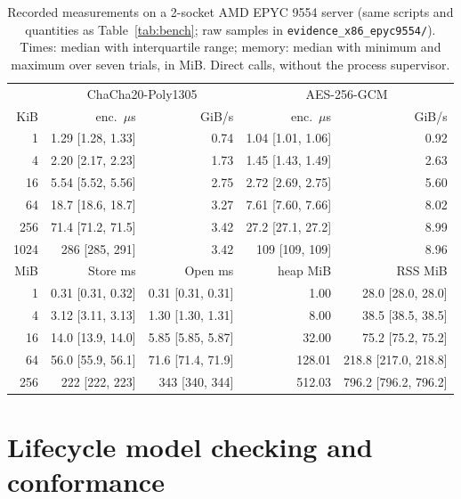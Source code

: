 \documentclass[pdflatex,sn-mathphys-num]{sn-jnl}
\newcommand{\fpath}[1]{\nolinkurl{#1}}%
\theoremstyle{plain}
\begin{document}
\begin{table}[htbp]
\caption{Recorded measurements on a 2-socket AMD EPYC 9554 server (same scripts and quantities as Table~\ref{tab:bench}; raw samples in \fpath{evidence_x86_epyc9554/}). Times: median with interquartile range; memory: median with minimum and maximum over seven trials, in MiB. Direct calls, without the process supervisor.}\label{tab:bench-x86}
\centering\footnotesize
\begin{tabular}{@{}rrrrr@{}}\toprule
& \multicolumn{2}{c}{ChaCha20-Poly1305} & \multicolumn{2}{c}{AES-256-GCM}\\
KiB & enc.\ $\mu$s & GiB/s & enc.\ $\mu$s & GiB/s\\\midrule
1 & 1.29 [1.28, 1.33] & 0.74 & 1.04 [1.01, 1.06] & 0.92\\
4 & 2.20 [2.17, 2.23] & 1.73 & 1.45 [1.43, 1.49] & 2.63\\
16 & 5.54 [5.52, 5.56] & 2.75 & 2.72 [2.69, 2.75] & 5.60\\
64 & 18.7 [18.6, 18.7] & 3.27 & 7.61 [7.60, 7.66] & 8.02\\
256 & 71.4 [71.2, 71.5] & 3.42 & 27.2 [27.1, 27.2] & 8.99\\
1024 & 286 [285, 291] & 3.42 & 109 [109, 109] & 8.96\\
\midrule
MiB & Store ms & Open ms & heap MiB & RSS MiB\\\midrule
1 & 0.31 [0.31, 0.32] & 0.31 [0.31, 0.31] & 1.00 & 28.0 [28.0, 28.0]\\
4 & 3.12 [3.11, 3.13] & 1.30 [1.30, 1.31] & 8.00 & 38.5 [38.5, 38.5]\\
16 & 14.0 [13.9, 14.0] & 5.85 [5.85, 5.87] & 32.00 & 75.2 [75.2, 75.2]\\
64 & 56.0 [55.9, 56.1] & 71.6 [71.4, 71.9] & 128.01 & 218.8 [217.0, 218.8]\\
256 & 222 [222, 223] & 343 [340, 344] & 512.03 & 796.2 [796.2, 796.2]\\\bottomrule
\end{tabular}
\end{table}

\section{Lifecycle model checking and conformance}\label{sec:s-formal}
\end{document}
